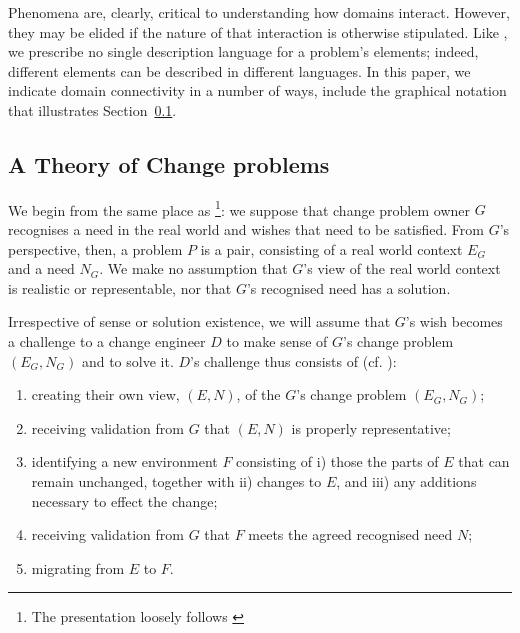 \documentclass[runningheads,a4paper]{llncs}
\begin{document}


Phenomena are, clearly, critical to understanding how domains interact. However, they may be elided if the nature of that interaction is otherwise stipulated. Like \POE{}, we prescribe no single description language for a problem's elements; indeed, different elements can be described in different languages. In this paper, we indicate domain connectivity in a number of ways, include the graphical notation that illustrates Section~\ref{sect:ChangeProblemSolving}.

\subsection{A Theory of Change problems}
\label{sect:ChangeProblemSolving}

We begin from the same place as \POE{}\footnote{The presentation loosely follows \cite{hall2016a-design}}: we suppose that change problem owner $G$ recognises a need in the real world and wishes that need to be satisfied. From $G$'s perspective, then, a  problem $P$ is a pair, consisting of a real world context $E_G$ and a need $N_G$. We make no assumption that $G$'s view of the real world context is realistic or representable, nor that $G$'s recognised need has a solution. 

Irrespective of sense or solution existence, we will assume that $G$'s wish becomes a challenge to a change engineer $D$ to make sense of $G$'s change problem $(E_G,N_G)$ and to solve it. $D$'s challenge thus consists of (cf. \cite{hall2016a-design}):
%
\begin{enumerate}[label=CPS\arabic*.]
	\item creating their own view, $(E, N)$, of the $G$'s change problem $(E_G, N_G)$;
	\item receiving validation from $G$ that $(E, N)$ is properly representative;
	\item identifying a new environment $F$ consisting of i) those the parts of $E$ that can remain unchanged, together with ii) changes to $E$, and iii) any additions necessary to effect the change;
	\item receiving validation from $G$ that $F$ meets the agreed recognised need $N$;
	\item migrating from $E$ to $F$.
\end{enumerate}
\end{document}
